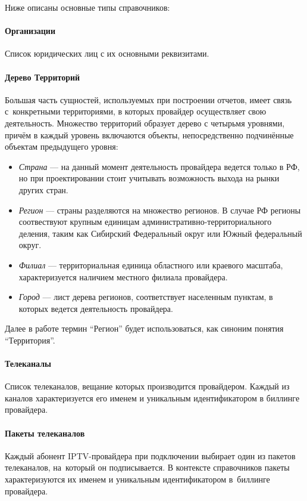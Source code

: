 Ниже описаны основные типы справочников:
\paragraph{Организации}
Список юридических лиц с их основными реквизитами. 

\paragraph{Дерево Территорий}
\label{par:regions}
Большая часть сущностей, используемых при построении отчетов, имеет связь с~конкретными территориями,
в которых провайдер осуществляет свою деятельность. Множество территорий образует дерево 
с четырьмя уровнями, причём в каждый уровень включаются объекты, непосредственно подчинённые объектам предыдущего уровня:

\begin{itemize}
\item{
  \textit{Страна} --- на данный момент деятельность провайдера ведется только в РФ, но при проектировании
  стоит учитывать возможность выхода на рынки других стран.
}
\item{
  \textit{Регион} --- страны разделяются на множество регионов. В случае РФ регионы соотвествуют
  крупным единицам административно-территориального деления, таким как Сибирский Федеральный округ 
  или Южный федеральный округ.
}
\item{
  \textit{Филиал} --- территориальная единица областного или краевого масштаба, характеризуется наличием
  местного филиала провайдера.
}
\item{
  \textit{Город} --- лист дерева регионов, соответствует населенным пунктам, в которых ведется деятельность провайдера.
}
\end{itemize}

Далее в работе термин ``Регион'' будет использоваться, как синоним понятия ``Территория''.

\paragraph{Телеканалы}
Список телеканалов, вещание которых производится провайдером. Каждый из каналов характеризуется его именем
и уникальным идентификатором в биллинге провайдера.

\paragraph{Пакеты телеканалов}
Каждый абонент IPTV-провайдера при подключении выбирает один из пакетов телеканалов, на~который
он подписывается. В контексте справочников пакеты характеризуются их именем и уникальным идентификатором
в~биллинге провайдера.

